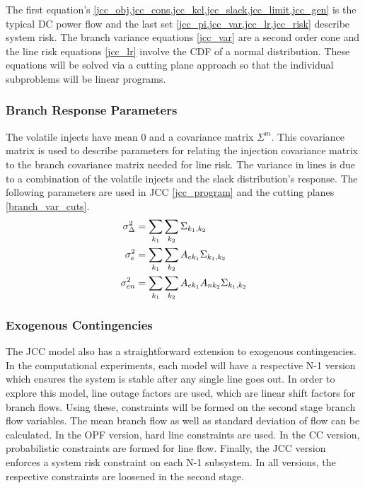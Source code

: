 The first equation's \cref{jcc_obj,jcc_cons,jcc_kcl,jcc_slack,jcc_limit,jcc_gen} is the typical DC power flow and the last set \cref{jcc_pi,jcc_var,jcc_lr,jcc_risk} describe system risk.  The branch variance equations \ref{jcc_var} are a second order cone and the line risk equations \ref{jcc_lr} involve the CDF of a normal distribution.  These equations will be solved via a cutting plane approach so that the individual subproblems will be linear programs.


\subsubsection*{Branch Response Parameters}
The volatile injects have mean 0 and a covariance matrix $\Sigma^m$.  This covariance matrix is used to describe parameters for relating the injection covariance matrix to the branch covariance matrix needed for line risk.  The variance in lines is due to a combination of the volatile injects and the slack distribution's response.  The following parameters are used in JCC \ref{jcc_program} and the cutting planes \ref{branch_var_cuts}.
\begin{subequations}
\begin{align}
 \sigma_\Delta^2 &= \sum_{k_1} \sum_{k_2} \Sigma_{k_1,k_2}  \\
 \sigma_e^2 &= \sum_{k_1} \sum_{k_2} A_{ek_1} \Sigma_{k_1,k_2} \\
 \sigma_{en}^2 &= \sum_{k_1} \sum_{k_2} A_{ek_1} A_{nk_2} \Sigma_{k_1,k_2}
\end{align}
\end{subequations}


\subsubsection{Exogenous Contingencies}
The JCC model also has a straightforward extension to exogenous contingencies.  In the computational experiments, each model will have a respective N-1 version which ensures the system is stable after any single line goes out.  In order to explore this model, line outage factors are used, which are linear shift factors for branch flows.  Using these, constraints will be formed on the second stage branch flow variables.  The mean branch flow as well as standard deviation of flow can be calculated.  In the OPF version, hard line constraints are used.  In the CC version, probabilistic constraints are formed for line flow.  Finally, the JCC version enforces a system risk constraint on each N-1 subsystem.  In all versions, the respective constraints are loosened in the second stage.

